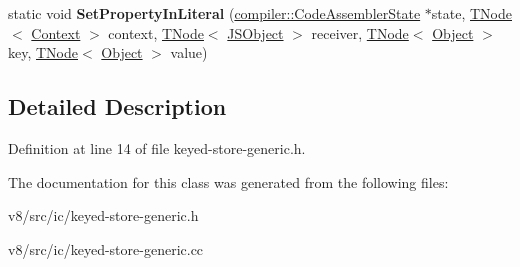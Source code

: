 \begin{DoxyCompactItemize}
\item 
\mbox{\label{classv8_1_1internal_1_1KeyedStoreGenericGenerator_a10c80822dda9bf7a9f759eb6665739d1}} 
static void {\bfseries Set\+Property\+In\+Literal} (\mbox{\hyperlink{classv8_1_1internal_1_1compiler_1_1CodeAssemblerState}{compiler\+::\+Code\+Assembler\+State}} $\ast$state, \mbox{\hyperlink{classv8_1_1internal_1_1compiler_1_1TNode}{T\+Node}}$<$ \mbox{\hyperlink{classv8_1_1internal_1_1Context}{Context}} $>$ context, \mbox{\hyperlink{classv8_1_1internal_1_1compiler_1_1TNode}{T\+Node}}$<$ \mbox{\hyperlink{classv8_1_1internal_1_1JSObject}{J\+S\+Object}} $>$ receiver, \mbox{\hyperlink{classv8_1_1internal_1_1compiler_1_1TNode}{T\+Node}}$<$ \mbox{\hyperlink{classv8_1_1internal_1_1Object}{Object}} $>$ key, \mbox{\hyperlink{classv8_1_1internal_1_1compiler_1_1TNode}{T\+Node}}$<$ \mbox{\hyperlink{classv8_1_1internal_1_1Object}{Object}} $>$ value)
\end{DoxyCompactItemize}


\subsection{Detailed Description}


Definition at line 14 of file keyed-\/store-\/generic.\+h.



The documentation for this class was generated from the following files\+:\begin{DoxyCompactItemize}
\item 
v8/src/ic/keyed-\/store-\/generic.\+h\item 
v8/src/ic/keyed-\/store-\/generic.\+cc\end{DoxyCompactItemize}
